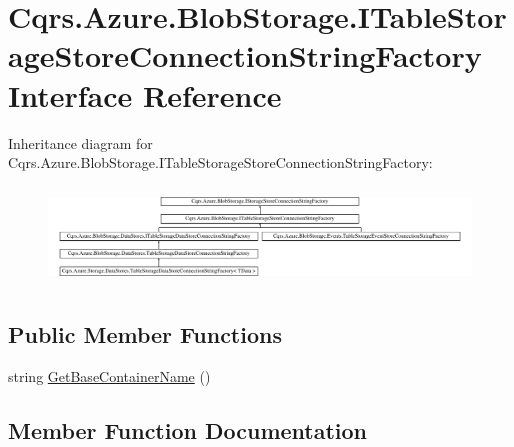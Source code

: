 \hypertarget{interfaceCqrs_1_1Azure_1_1BlobStorage_1_1ITableStorageStoreConnectionStringFactory}{}\section{Cqrs.\+Azure.\+Blob\+Storage.\+I\+Table\+Storage\+Store\+Connection\+String\+Factory Interface Reference}
\label{interfaceCqrs_1_1Azure_1_1BlobStorage_1_1ITableStorageStoreConnectionStringFactory}
Inheritance diagram for Cqrs.\+Azure.\+Blob\+Storage.\+I\+Table\+Storage\+Store\+Connection\+String\+Factory\+:\begin{figure}[H]
\begin{center}
\leavevmode
\includegraphics[height=2.636535cm]{interfaceCqrs_1_1Azure_1_1BlobStorage_1_1ITableStorageStoreConnectionStringFactory}
\end{center}
\end{figure}
\subsection*{Public Member Functions}
\begin{DoxyCompactItemize}
\item 
string \hyperlink{interfaceCqrs_1_1Azure_1_1BlobStorage_1_1ITableStorageStoreConnectionStringFactory_a1b9bfc9dcb7292e62619fc46e4a85982}{Get\+Base\+Container\+Name} ()
\end{DoxyCompactItemize}


\subsection{Member Function Documentation}
\mbox{\label{interfaceCqrs_1_1Azure_1_1BlobStorage_1_1ITableStorageStoreConnectionStringFactory_a1b9bfc9dcb7292e62619fc46e4a85982}} 

